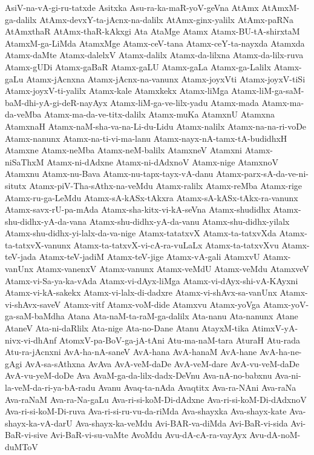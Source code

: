 {AsiV-na-vA-gi-ru-tatxde
Asitxka
Asu-ra-ka-maR-yoV-geVna
AtAmx
AtAmxM-ga-dalilx
AtAmx-devxY-ta-jAcnx-na-dalilx
AtAmx-ginx-yalilx
AtAmx-paRNa
AtAmxthaR
AtAmx-thaR-kAkxgi
Ata
AtaMge
Atamx
Atamx-BU-tA-shirxtaM
AtamxM-ga-LiMda
AtamxMge
Atamx-ceV-tana
Atamx-ceY-ta-nayxda
Atamxda
Atamx-daMte
Atamx-dalelxV
Atamx-dalilx
Atamx-da-lilxna
Atamx-da-lilx-ruva
Atamx-gUDi
Atamx-gaBaR
Atamx-gaLU
Atamx-gaLa
Atamx-ga-Lalilx
Atamx-gaLu
Atamx-jAcnxna
Atamx-jAcnx-na-vanunx
Atamx-joyxVti
Atamx-joyxV-tiSi
Atamx-joyxV-ti-yalilx
Atamx-kale
Atamxkekx
Atamx-liMga
Atamx-liM-ga-saM-baM-dhi-yA-gi-deR-nayAyx
Atamx-liM-ga-ve-lilx-yadu
Atamx-mada
Atamx-ma-da-veMba
Atamx-ma-da-ve-titx-dalilx
Atamx-muKa
AtamxnU
Atamxna
AtamxnaH
Atamx-naM-sha-va-na-Li-du-Lidu
Atamx-nalilx
Atamx-na-na-ri-voDe
Atamx-nanunx
Atamx-na-ti-vi-ma-lanu
Atamx-nayx-nA-tamx-tA-budidhxH
Atamxne
Atamx-neMba
Atamx-neM-balilx
AtamxneV
Atamxni
Atamx-niSaThxM
Atamx-ni-dAdxne
Atamx-ni-dAdxnoV
Atamx-nige
AtamxnoV
Atamxnu
Atamx-nu-Bava
Atamx-nu-tapx-tayx-vA-danu
Atamx-parx-sA-da-ve-ni-situtx
Atamx-piV-Tha-sAthx-na-veMdu
Atamx-ralilx
Atamx-reMba
Atamx-rige
Atamx-ru-ga-LeMdu
Atamx-sA-kASx-tAkxra
Atamx-sA-kASx-tAkx-ra-vanunx
Atamx-savx-rU-pa-mAda
Atamx-sha-kitx-vi-kA-seVna
Atamx-shudidhx
Atamx-shu-didhx-yA-da-vana
Atamx-shu-didhx-yA-da-vanu
Atamx-shu-didhx-yilalx
Atamx-shu-didhx-yi-lalx-da-va-nige
Atamx-tatatxvX
Atamx-ta-tatxvXda
Atamx-ta-tatxvX-vanunx
Atamx-ta-tatxvX-vi-cA-ra-vuLaLx
Atamx-ta-tatxvXvu
Atamx-teV-jada
Atamx-teV-jadiM
Atamx-teV-jige
Atamx-vA-gali
AtamxvU
Atamx-vanUnx
Atamx-vanenxV
Atamx-vanunx
Atamx-veMdU
Atamx-veMdu
AtamxveV
Atamx-vi-Sa-ya-ka-vAda
Atamx-vi-dAyx-liMga
Atamx-vi-dAyx-shi-vA-KAyxni
Atamx-vi-kA-sakekx
Atamx-vi-lalx-di-dadxre
Atamx-vi-shAvx-sa-vanUnx
Atamx-vi-shAvx-saveV
Atamx-vitf
Atamx-voM-dide
Atamxvu
Atamx-yoVga
Atamx-yoV-ga-saM-baMdha
Atana
Ata-naM-ta-raM-ga-dalilx
Ata-nanu
Ata-nanunx
Atane
AtaneV
Ata-ni-daRlilx
Ata-nige
Ata-no-Dane
Atanu
AtayxM-tika
AtimxV-yA-nivx-vi-dhAnf
AtomxV-pa-BoV-ga-jA-tAni
Atu-ma-naM-tara
AturaH
Atu-rada
Atu-ra-jAcnxni
AvA-ha-nA-saneV
AvA-hana
AvA-hanaM
AvA-hane
AvA-ha-ne-gAgi
AvA-sa-sAthxna
AvAva
AvA-veM-daDe
AvA-veM-dare
AvA-vu-veM-daDe
AvA-vu-yeM-doDe
Ava
AvaM-ga-da-lilx-dadx-DeVnu
Ava-nA-no-babxnu
Ava-ni-la-veM-da-ri-ya-bA-radu
Avanu
Avaq-ta-nAda
Avaqtitx
Ava-ra-NAni
Ava-raNa
Ava-raNaM
Ava-ra-Na-gaLu
Ava-ri-si-koM-Di-dAdxne
Ava-ri-si-koM-Di-dAdxnoV
Ava-ri-si-koM-Di-ruva
Ava-ri-si-ru-vu-da-riMda
Ava-shayxka
Ava-shayx-kate
Ava-shayx-ka-vA-darU
Ava-shayx-ka-veMdu
Avi-BAR-va-diMda
Avi-BaR-vi-sida
Avi-BaR-vi-sive
Avi-BaR-vi-su-vaMte
AvoMdu
Avu-dA-cA-ra-vayAyx
Avu-dA-noM-duMToV
}
